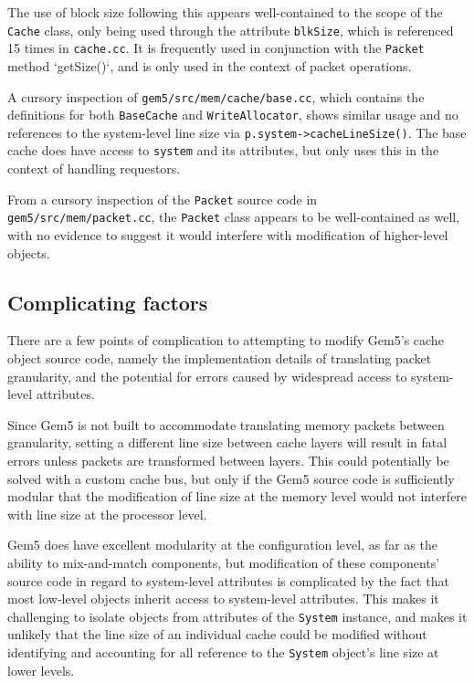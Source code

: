 \documentclass[12pt,twoside]{reedthesis}
\begin{document}
	The use of block size following this appears well-contained to the scope of the \verb`Cache` class, only being used through the attribute \verb`blkSize`, which is referenced 15 times in \verb`cache.cc`. It is frequently used in conjunction with the \verb`Packet` method `getSize()`, and is only used in the context of packet operations.
	
	A cursory inspection of \verb`gem5/src/mem/cache/base.cc`, which contains the definitions for both \verb`BaseCache` and \verb`WriteAllocator`, shows similar usage and no references to the system-level line size via \verb`p.system->cacheLineSize()`. The base cache does have access to \verb`system` and its attributes, but only uses this in the context of handling requestors.
	
	From a cursory inspection of the \verb`Packet` source code in \verb`gem5/src/mem/packet.cc`, the \verb`Packet` class appears to be well-contained as well, with no evidence to suggest it would interfere with modification of higher-level objects.

	\subsection*{Complicating factors}

	There are a few points of complication to attempting to modify Gem5's cache object source code, namely the implementation details of translating packet granularity, and the potential for errors caused by widespread access to system-level attributes.
	
	Since Gem5 is not built to accommodate translating memory packets between granularity, setting a different line size between cache layers will result in fatal errors unless packets are transformed between layers. This could potentially be solved with a custom cache bus, but only if the Gem5 source code is sufficiently modular that the modification of line size at the memory level would not interfere with line size at the processor level.
	
	Gem5 does have excellent modularity at the configuration level, as far as the ability to mix-and-match components, but modification of these components' source code in regard to system-level attributes is complicated by the fact that most low-level objects inherit access to system-level attributes. This makes it challenging to isolate objects from attributes of the \verb`System` instance, and makes it unlikely that the line size of an individual cache could be modified without identifying and accounting for all reference to the \verb`System` object's line size at lower levels.
\end{document}
